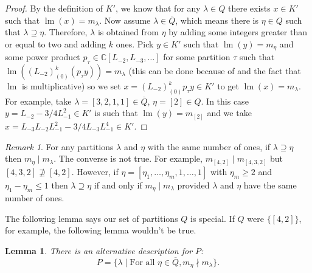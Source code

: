 \documentclass[12pt, a4paper]{article}
\newtheorem{lemma}[theorem]{Lemma}
\theoremstyle{remark}
\newtheorem{remark}[theorem]{Remark}
\DeclareMathOperator{\lm}{lm}
\begin{document}
\begin{proof}
  By the definition of $K'$, we know that for any $\lambda \in Q$ there exists $x \in K'$ such that $\lm(x) = m_\lambda$.
  Now assume $\lambda \in \overline{Q}$, which means there is $\eta \in Q$ such that $\lambda \supseteq \eta$.
  Therefore, $\lambda$ is obtained from $\eta$ by adding some integers greater than or equal to two and adding $k$ ones.
  Pick $y \in K'$ such that $\lm(y) = m_\eta$ and some power product $p_\tau \in \mathbb{C}[L_{-2}, L_{-3}, \dots]$ for some partition $\tau$ such that $\lm((L_{-2})^k_{(0)}(p_\tau y)) = m_\lambda$ (this can be done because of  and the fact that $\lm$ is multiplicative) so we set $x = (L_{-2})^k_{(0)}p_\tau y \in K'$ to get $\lm(x) = m_\lambda$.
  For example, take $\lambda = [3, 2, 1, 1] \in \overline{Q}$, $\eta = [2] \in Q$.
  In this case $y = L_{-2}- 3/4L_{-1}^2\in K'$ is such that $\lm(y) = m_{[2]}$ and we take $x = L_{-3}L_{-2}L_{-1}^2 - 3/4L_{-3}L_{-1}^4 \in K'$.
\end{proof}

\begin{remark}
  \label{rmk:4}
  For any partitions $\lambda$ and $\eta$ with the same number of ones, if $\lambda \supseteq \eta$ then $m_\eta \mid m_\lambda$.
  The converse is not true.
  For example, $m_{[4, 2]} \mid m_{[4, 3, 2]}$ but $[4, 3, 2] \nsupseteq [4, 2]$.
  However, if $\eta = [\eta_1, \dots, \eta_m, 1, \dots, 1]$ with $\eta_m \ge 2$ and $\eta_1 - \eta_m \le 1$ then $\lambda \supseteq \eta$ if and only if $m_\eta \mid m_\lambda$ provided $\lambda$ and $\eta$ have the same number of ones.
\end{remark}

The following lemma says our set of partitions $Q$ is special.
If $Q$ were $\{[4, 2]\}$, for example, the following lemma wouldn't be true.

\begin{lemma}
  \label{lmm:12}
  There is an alternative description for $P$:
  \begin{equation*}
    P = \{\lambda \mid \text{For all }\eta \in \overline{Q}, m_\eta \nmid m_\lambda\}.
  \end{equation*}
\end{lemma}
\end{document}
